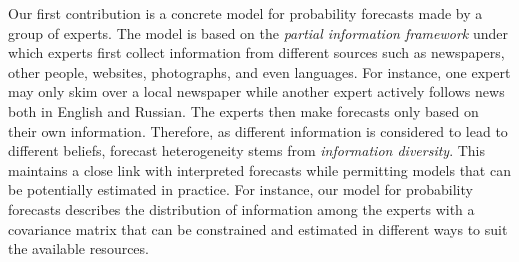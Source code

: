 \documentclass[11pt]{article}
\theoremstyle{definition}
\theoremstyle{definition}
\begin{document}
Our first contribution is a concrete model for probability forecasts made by a group of experts. The model is based on the \textit{partial information framework} under which experts first collect information from different sources such as newspapers, other people, websites, photographs, and even languages. For instance, one expert may only skim over a local newspaper while another expert actively follows news both in English and Russian. The experts then make forecasts only based on their own information.
Therefore, as different information is considered to lead to different beliefs, forecast heterogeneity stems from \textit{information diversity}. This maintains a close link with interpreted forecasts while permitting models that can be potentially estimated in practice. For instance, our model for probability forecasts describes the distribution of information among the experts with a covariance matrix that can be constrained and estimated in different ways to suit the available resources. 

\end{document}
